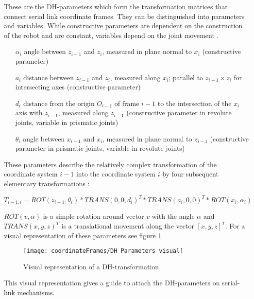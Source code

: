 These are the \ac{DH}-parameters which form the transformation matrices that connect serial link coordinate frames. They can be distinguished into parameters and variables. While constructive parameters are dependent on the construction of the robot and are constant, variables depend on the joint movement \cite{FwdInvAnalysRobManip} \cite{ConstantinForwardKA} \cite{DenavitHartenbergKonventionen}.

\begin{enumerate}[label=\emph{\arabic*)}]
	\item[$\alpha_i$] angle between $z_{i-1}$ and $z_i$, measured in plane normal to $x_i$ (constructive parameter)
	\item[$a_i$] distance between $z_{i-1}$ and $z_i$, measured along $x_i$; parallel to $z_{i-1} \times z_i$ for intersecting axes (constructive parameter)
	\item[$d_i$] distance from the origin $O_{i-1}$ of frame $i-1$ to the intersection of the $x_i$ axis with $z_{i-1}$, measured along $z_{i-1}$ (constructive parameter in revolute joints, variable in prismatic joints)
	\item[$\theta_i$] angle between $x_{i-1}$ and $x_i$, measured in plane normal to $z_{i-1}$ (constructive parameter in prismatic joints, variable in revolute joints)
\end{enumerate}

These parameters describe the relatively complex transformation of the coordinate system $i-1$ into the coordinate system $i$ by four subsequent elementary transformations \cite{allgInvKin}:

\begin{equation} \label{eq:DH-Transform}
T_{i-1,i}=ROT(z_{i-1}, \theta_i) * TRANS(0,0,d_i)^T * TRANS(a_i,0,0)^T * ROT(x_i,\alpha_i)
\end{equation}

$ROT(v,\alpha)$ is a simple rotation around vector $v$ with the angle $\alpha$ and $TRANS(x,y,z)^T$ is a translational movement along the vector $[x,y,z]^T$. For a visual representation of these parameters see figure \ref{fig:DH_Parameters_visual} 

\begin{figure}[H]
	\texttt{[image: coordinateFrames/DH\_Parameters\_visual]}
	\caption{Visual representation of a \ac{DH}-transformation}
	\label{fig:DH_Parameters_visual}
\end{figure}

This visual representation gives a guide to attach the \ac{DH}-parameters on serial-link mechanisms.


